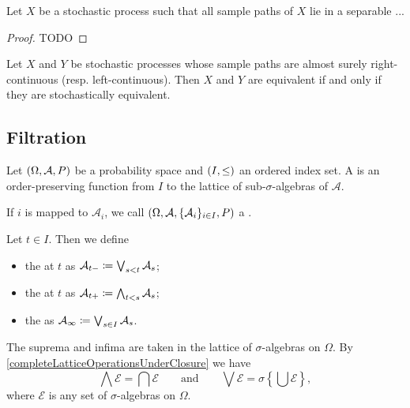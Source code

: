 \begin{proposition}
Let $X$ be a stochastic process such that all sample paths of $X$ lie in a separable ...
\end{proposition}
\begin{proof}
TODO
\end{proof}
\begin{corollary}
Let $X$ and $Y$ be stochastic processes whose sample paths are almost surely right-continuous (resp. left-continuous). Then $X$ and $Y$ are equivalent \textup{if and only if} they are stochastically equivalent.
\end{corollary}

\subsection{Filtration}
\begin{definition}
Let  $\left( \Omega, \mathcal{A}, P \right)$ be a probability space and $\left( I,\leq \right)$ an ordered index set. A  is an order-preserving function from $I$ to the lattice of sub-$\sigma$-algebras of $\mathcal{A}$.

If $i$ is mapped to $\mathcal{A}_i$, we call $\left( \Omega, \mathcal{A}, \{\mathcal{A}_i\}_{i\in I}, P \right)$ a .

Let $t\in I$. Then we define
\begin{itemize}
\item the  at $t$ as $\mathcal{A}_{t-} \coloneqq \bigvee_{s<t}\mathcal{A}_s$;
\item the  at $t$ as $\mathcal{A}_{t+} \coloneqq \bigwedge_{t<s}\mathcal{A}_s$;
\item the  as $\mathcal{A}_{\infty} \coloneqq \bigvee_{s\in I}\mathcal{A}_s$.
\end{itemize}
\end{definition}
The suprema and infima are taken in the lattice of $\sigma$-algebras on $\Omega$. By \ref{completeLatticeOperationsUnderClosure} we have
\[ \bigwedge\mathcal{E} = \bigcap\mathcal{E} \qquad\text{and}\qquad \bigvee\mathcal{E} = \sigma\left\{\bigcup \mathcal{E}\right\},  \]
where $\mathcal{E}$ is any set of $\sigma$-algebras on $\Omega$.

